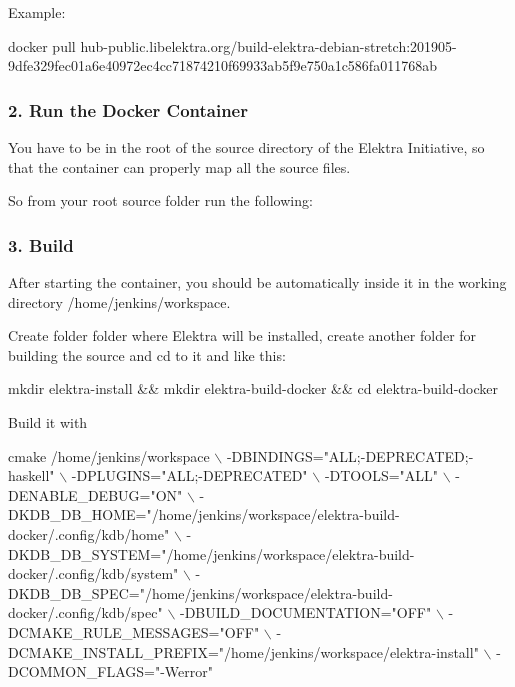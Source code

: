 Example\+:


\begin{DoxyCode}
docker pull
       hub-public.libelektra.org/build-elektra-debian-stretch:201905-9dfe329fec01a6e40972ec4cc71874210f69933ab5f9e750a1c586fa011768ab
\end{DoxyCode}


\subsubsection*{2. Run the Docker Container}

You have to be in the root of the source directory of the Elektra Initiative, so that the container can properly map all the source files.

So from your root source folder run the following\+:




\subsubsection*{3. Build}

After starting the container, you should be automatically inside it in the working directory {\ttfamily /home/jenkins/workspace}.

Create folder folder where Elektra will be installed, create another folder for building the source and {\ttfamily cd} to it and like this\+:


\begin{DoxyCode}
mkdir elektra-install && mkdir elektra-build-docker && cd elektra-build-docker
\end{DoxyCode}


Build it with


\begin{DoxyCode}
 cmake /home/jenkins/workspace \(\backslash\)
-DBINDINGS="ALL;-DEPRECATED;-haskell" \(\backslash\)
-DPLUGINS="ALL;-DEPRECATED" \(\backslash\)
-DTOOLS="ALL" \(\backslash\)
-DENABLE\_DEBUG="ON" \(\backslash\)
-DKDB\_DB\_HOME="/home/jenkins/workspace/elektra-build-docker/.config/kdb/home" \(\backslash\)
-DKDB\_DB\_SYSTEM="/home/jenkins/workspace/elektra-build-docker/.config/kdb/system" \(\backslash\)
-DKDB\_DB\_SPEC="/home/jenkins/workspace/elektra-build-docker/.config/kdb/spec" \(\backslash\)
-DBUILD\_DOCUMENTATION="OFF" \(\backslash\)
-DCMAKE\_RULE\_MESSAGES="OFF" \(\backslash\)
-DCMAKE\_INSTALL\_PREFIX="/home/jenkins/workspace/elektra-install" \(\backslash\)
-DCOMMON\_FLAGS="-Werror"
\end{DoxyCode}


